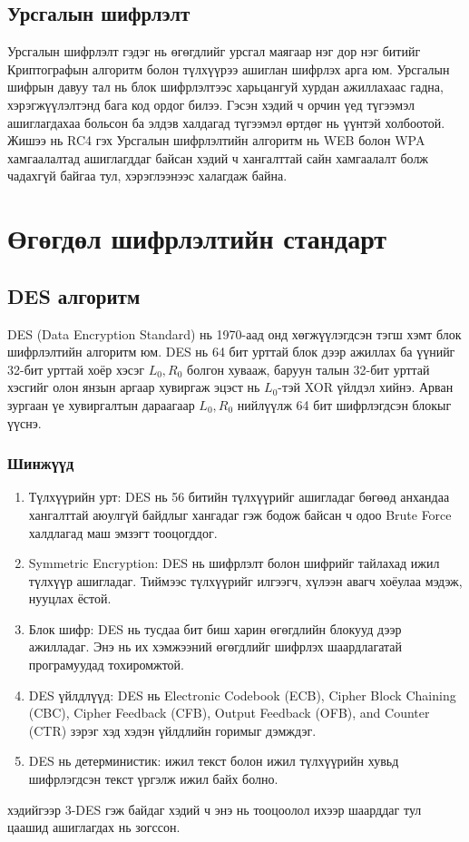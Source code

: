\subsection{Урсгалын шифрлэлт}
Урсгалын шифрлэлт гэдэг нь өгөгдлийг урсгал маягаар нэг дор нэг битийг Криптографын алгоритм болон түлхүүрээ ашиглан шифрлэх арга юм. Урсгалын шифрын давуу тал нь блок шифрлэлтээс харьцангуй хурдан ажиллахаас гадна, хэрэгжүүлэлтэнд бага код ордог билээ. Гэсэн хэдий ч орчин үед түгээмэл ашиглагдахаа больсон ба элдэв халдагад түгээмэл өртдөг нь үүнтэй холбоотой. Жишээ нь RC4 гэх Урсгалын шифрлэлтийн алгоритм нь WEB болон WPA хамгаалалтад ашиглагддаг байсан хэдий ч хангалттай сайн хамгаалалт болж чадахгүй байгаа тул, хэрэглээнээс халагдаж байна.

\section{Өгөгдөл шифрлэлтийн стандарт}
\subsection{DES алгоритм}
DES (Data Encryption Standard) нь 1970-аад онд хөгжүүлэгдсэн тэгш хэмт блок шифрлэлтийн алгоритм юм. DES нь 64 бит урттай блок дээр ажиллах ба үүнийг 32-бит урттай хоёр хэсэг $L_{0}, R_{0}$ болгон хувааж, баруун талын 32-бит урттай хэсгийг олон янзын аргаар хувиргаж эцэст нь $L_{0}$-тэй XOR үйлдэл хийнэ. Арван зургаан үе хувиргалтын дараагаар $L_{0}, R_{0}$ нийлүүлж 64 бит шифрлэгдсэн блокыг үүснэ.
\subsubsection{Шинжүүд}
\begin{enumerate}
	\item Түлхүүрийн урт: DES нь 56 битийн түлхүүрийг ашигладаг бөгөөд анхандаа хангалттай аюулгүй байдлыг хангадаг гэж бодож байсан ч одоо Brute Force халдлагад маш эмзэгт тооцогддог.
	\item Symmetric Encryption: DES нь шифрлэлт болон шифрийг тайлахад ижил түлхүүр ашигладаг. Тиймээс түлхүүрийг илгээгч, хүлээн авагч хоёулаа мэдэж, нууцлах ёстой.

	\item Блок шифр: DES нь тусдаа бит биш харин өгөгдлийн блокууд дээр ажилладаг. Энэ нь их хэмжээний өгөгдлийг шифрлэх шаардлагатай програмуудад тохиромжтой.

	\item DES үйлдлүүд: DES нь  Electronic Codebook (ECB), Cipher Block Chaining (CBC), Cipher Feedback (CFB), Output Feedback (OFB), and Counter (CTR) зэрэг хэд хэдэн үйлдлийн горимыг дэмждэг.
	
	\item DES нь детерминистик: ижил текст болон ижил түлхүүрийн хувьд шифрлэгдсэн текст үргэлж ижил байх болно.
\end{enumerate}
хэдийгээр 3-DES гэж байдаг хэдий ч энэ нь тооцоолол ихээр шаарддаг тул цаашид ашиглагдах нь зогссон.

